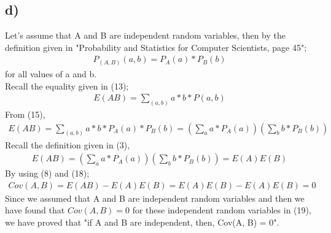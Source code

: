 \documentclass[12pt]{article}
\begin{document}
\subsection*{d)}
Let's assume that A and B are independent random variables, then by the definition given in "Probability and Statistics for Computer Scientists, page 45";
\begin{equation} 
\begin{split}
P_{(A,B)}(a,b) = P_{A}(a)*P_{B}(b)
\end{split}
\end{equation}
for all values of a and b. \\
Recall the equality given in (13);
\begin{equation} 
\begin{split}
E(AB) = \sum_{(a,b)}a*b*P(a,b)
\end{split}
\end{equation}
From (15),
\begin{equation} 
\begin{split}
E(AB) = \sum_{(a,b)}a*b*P_{A}(a)*P_{B}(b) = (\sum_{a}a*P_{A}(a))(\sum_{b}b*P_{B}(b))
\end{split}
\end{equation}
Recall the definition given in (3),
\begin{equation} 
\begin{split}
E(AB) = (\sum_{a}a*P_{A}(a))(\sum_{b}b*P_{B}(b)) = E(A)E(B)
\end{split}
\end{equation}
By using (8) and (18);
\begin{equation} 
\begin{split}
Cov(A,B) = E(AB) - E(A)E(B) = E(A)E(B) - E(A)E(B) = 0
\end{split}
\end{equation}
Since we assumed that A and B are independent random variables and then we have found that $Cov(A,B) = 0$ for these independent random variables in (19), we have proved that "if A and B are independent, then, Cov(A, B) = 0".
\end{document}
